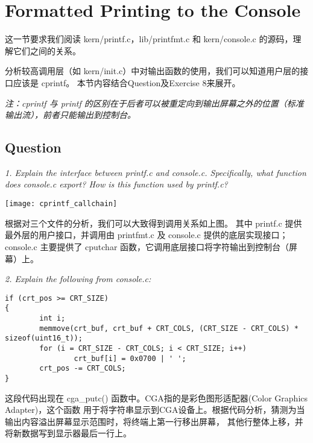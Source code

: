 \documentclass[12pt, letterpaper]{report}
\begin{document}
\section[\large Formatted Printing to the Console]{Formatted Printing to the Console}
这一节要求我们阅读 kern/printf.c，lib/printfmt.c 和 kern/console.c 的源码，理解它们之间的关系。\par 
分析较高调用层（如 kern/init.c）中对输出函数的使用，我们可以知道用户层的接口应该是 cprintf。
本节内容结合Question及Exercise 8来展开。\par
\textsl{注：cprintf 与 printf 的区别在于后者可以被重定向到输出屏幕之外的位置（标准输出流），前者只能输出到控制台。} \par 


\subsection{\large Question}
\textsl{1. Explain the interface between printf.c and console.c. 
        Specifically, what function does console.c export? 
        How is this function used by printf.c?} \par
\texttt{[image: cprintf\_callchain]} \par
根据对三个文件的分析，我们可以大致得到调用关系如上图。
其中 printf.c 提供最外层的用户接口，并调用由 printfmt.c 及 console.c 提供的底层实现接口；
console.c 主要提供了 cputchar 函数，它调用底层接口将字符输出到控制台（屏幕）上。 \par 
\quad \par


\textsl{2. Explain the following from console.c:} \par
\lstset{style=CStyle}
\setmainfont{Consolas}
\begin{lstlisting}
if (crt_pos >= CRT_SIZE) 
{
        int i;
        memmove(crt_buf, crt_buf + CRT_COLS, (CRT_SIZE - CRT_COLS) * sizeof(uint16_t));
        for (i = CRT_SIZE - CRT_COLS; i < CRT_SIZE; i++)
                crt_buf[i] = 0x0700 | ' ';
        crt_pos -= CRT_COLS;
}
\end{lstlisting}
\setmainfont{Times New Roman} \par
这段代码出现在 cga\_putc() 函数中。CGA指的是彩色图形适配器(Color Graphics Adapter)，这个函数
用于将字符串显示到CGA设备上。根据代码分析，猜测为当输出内容溢出屏幕显示范围时，将终端上第一行移出屏幕，
其他行整体上移，并将新数据写到显示器最后一行上。 \par 
\quad \par 
\quad \par
\end{document}
